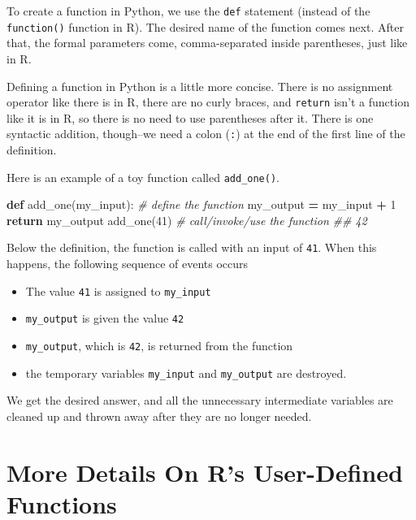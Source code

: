 \documentclass[
  12pt,
  krantz2]{krantz}
\makeatletter
\newenvironment{Shaded}{\begin{snugshade}}{\end{snugshade}}
\newcommand{\CommentTok}[1]{\textcolor[rgb]{0.37,0.37,0.37}{\textit{#1}}}
\newcommand{\ControlFlowTok}[1]{\textcolor[rgb]{0.27,0.27,0.27}{\textbf{#1}}}
\newcommand{\DecValTok}[1]{\textcolor[rgb]{0.06,0.06,0.06}{#1}}
\newcommand{\KeywordTok}[1]{\textcolor[rgb]{0.27,0.27,0.27}{\textbf{#1}}}
\newcommand{\NormalTok}[1]{#1}
\newcommand{\OperatorTok}[1]{\textcolor[rgb]{0.43,0.43,0.43}{\textbf{#1}}}
\providecommand{\tightlist}{%
  \setlength{\itemsep}{0pt}\setlength{\parskip}{0pt}}
\newenvironment{kframe}{%
\medskip{}
\setlength{\fboxsep}{.8em}
 \def\at@end@of@kframe{}%
 \ifinner\ifhmode%
  \def\at@end@of@kframe{\end{minipage}}%
  \begin{minipage}{\columnwidth}%
 \fi\fi%
 \def\FrameCommand##1{\hskip\@totalleftmargin \hskip-\fboxsep
 \colorbox{shadecolor}{##1}\hskip-\fboxsep
     \hskip-\linewidth \hskip-\@totalleftmargin \hskip\columnwidth}%
 \MakeFramed {\advance\hsize-\width
   \@totalleftmargin\z@ \linewidth\hsize
   \@setminipage}}%
 {\par\unskip\endMakeFramed%
 \at@end@of@kframe}
\renewenvironment{Shaded}{\begin{kframe}}{\end{kframe}}
\makeatother
\begin{document}
To create a function in Python, we use the \texttt{def} statement (instead of the \texttt{function()} function in R). The desired name of the function comes next. After that, the formal parameters come, comma-separated inside parentheses, just like in R.

Defining a function in Python is a little more concise. There is no assignment operator like there is in R, there are no curly braces, and \texttt{return} isn't a function like it is in R, so there is no need to use parentheses after it. There is one syntactic addition, though--we need a colon (\texttt{:}) at the end of the first line of the definition.

Here is an example of a toy function called \texttt{add\_one()}.

\begin{Shaded}
\begin{Highlighting}[]
\KeywordTok{def}\NormalTok{ add\_one(my\_input):  }\CommentTok{\# define the function}
\NormalTok{  my\_output }\OperatorTok{=}\NormalTok{ my\_input }\OperatorTok{+} \DecValTok{1}
  \ControlFlowTok{return}\NormalTok{ my\_output}
\NormalTok{add\_one(}\DecValTok{41}\NormalTok{) }\CommentTok{\# call/invoke/use the function }
\CommentTok{\#\# 42}
\end{Highlighting}
\end{Shaded}

Below the definition, the function is called with an input of \texttt{41}. When this happens, the following sequence of events occurs

\begin{itemize}
\tightlist
\item
  The value \texttt{41} is assigned to \texttt{my\_input}
\item
  \texttt{my\_output} is given the value \texttt{42}
\item
  \texttt{my\_output}, which is \texttt{42}, is returned from the function
\item
  the temporary variables \texttt{my\_input} and \texttt{my\_output} are destroyed.
\end{itemize}

We get the desired answer, and all the unnecessary intermediate variables are cleaned up and thrown away after they are no longer needed.

\hypertarget{more-details-on-rs-user-defined-functions}{%
\section{More Details On R's User-Defined Functions}\label{more-details-on-rs-user-defined-functions}}
\end{document}
